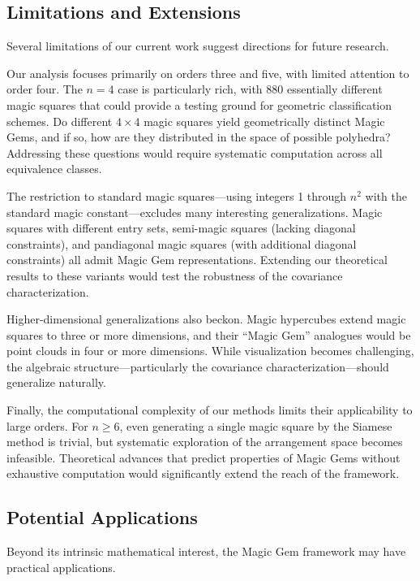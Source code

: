 \subsection{Limitations and Extensions}

Several limitations of our current work suggest directions for future research.

Our analysis focuses primarily on orders three and five, with limited attention to order four.
The $n = 4$ case is particularly rich, with 880 essentially different magic squares
that could provide a testing ground for geometric classification schemes.
Do different $4 \times 4$ magic squares yield geometrically distinct Magic Gems,
and if so, how are they distributed in the space of possible polyhedra?
Addressing these questions would require systematic computation across all equivalence classes.

The restriction to standard magic squares---using integers 1 through $n^2$ with the standard magic constant---excludes
many interesting generalizations.
Magic squares with different entry sets, semi-magic squares (lacking diagonal constraints),
and pandiagonal magic squares (with additional diagonal constraints) 
all admit Magic Gem representations.
Extending our theoretical results to these variants would test the robustness of the covariance characterization.

Higher-dimensional generalizations also beckon.
Magic hypercubes extend magic squares to three or more dimensions,
and their ``Magic Gem'' analogues would be point clouds in four or more dimensions.
While visualization becomes challenging, the algebraic structure---particularly the covariance characterization---should 
generalize naturally.

Finally, the computational complexity of our methods limits their applicability to large orders.
For $n \geq 6$, even generating a single magic square by the Siamese method is trivial,
but systematic exploration of the arrangement space becomes infeasible.
Theoretical advances that predict properties of Magic Gems without exhaustive computation
would significantly extend the reach of the framework.

\subsection{Potential Applications}

Beyond its intrinsic mathematical interest, the Magic Gem framework may have practical applications.

